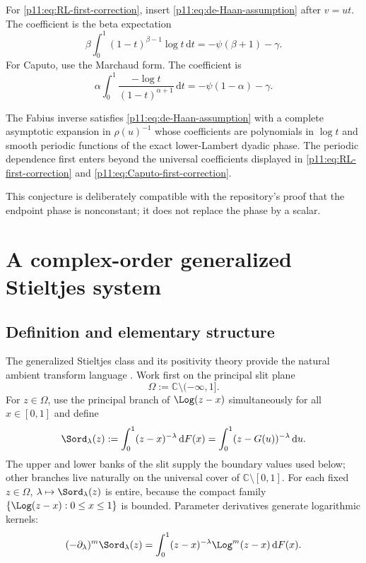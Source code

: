 \documentclass[11pt,oneside]{article}
\theoremstyle{definition}
\theoremstyle{remark}
\newcommand{\C}{\mathbb C}
\newcommand{\dd}{\,\mathrm d}
\newcommand{\1}{\mathbf 1}
\begin{document}
\begin{proofidea}
For \eqref{p11:eq:RL-first-correction}, insert
\eqref{p11:eq:de-Haan-assumption} after $v=ut$.  The coefficient is the beta
expectation
\begin{equation}
 \beta\int_0^1(1-t)^{\beta-1}\log t\dd t
 =-\psi(\beta+1)-\gamma.
\end{equation}
For Caputo, use the Marchaud form.  The coefficient is
\begin{equation}
 \alpha\int_0^1\frac{-\log t}{(1-t)^{\alpha+1}}\dd t
 =-\psi(1-\alpha)-\gamma.
\end{equation}
\end{proofidea}

\begin{conjecture}
\label{p11:conj:de-Haan}
The Fabius inverse satisfies \eqref{p11:eq:de-Haan-assumption} with a complete
asymptotic expansion in $\rho(u)^{-1}$ whose coefficients are polynomials in
$\log t$ and smooth periodic functions of the exact lower-Lambert dyadic
phase.  The periodic dependence first enters beyond the universal
coefficients displayed in \eqref{p11:eq:RL-first-correction} and
\eqref{p11:eq:Caputo-first-correction}.
\end{conjecture}

This conjecture is deliberately compatible with the repository's proof that
the endpoint phase is nonconstant; it does not replace the phase by a scalar.

\section{A complex-order generalized Stieltjes system}
\label{p11:sec:stieltjes}

\subsection{Definition and elementary structure}

The generalized Stieltjes class and its positivity theory provide the
natural ambient transform language \cite{p11:Sokal}.  Work first on the principal
slit plane
\begin{equation}
 \Omega:=\C\setminus(-\infty,1].
\end{equation}
For $z\in\Omega$, use the principal branch of $\Log(z-x)$ simultaneously for
all $x\in[0,1]$ and define
\begin{equation}
 \Sord_\lambda(z)
 :=\int_0^1(z-x)^{-\lambda}\dd F(x)
 =\int_0^1(z-G(u))^{-\lambda}\dd u.
 \label{p11:eq:generalized-Stieltjes-def}
\end{equation}
The upper and lower banks of the slit supply the boundary values used below;
other branches live naturally on the universal cover of
$\C\setminus[0,1]$.  For each fixed $z\in\Omega$,
$\lambda\mapsto\Sord_\lambda(z)$ is entire, because the compact family
$\{\Log(z-x):0\le x\le1\}$ is bounded.  Parameter derivatives
generate logarithmic kernels:
\begin{equation}
 (-\partial_\lambda)^m\Sord_\lambda(z)
 =\int_0^1(z-x)^{-\lambda}\Log^m(z-x)\dd F(x).
 \label{p11:eq:lambda-log-kernels}
\end{equation}
\end{document}
